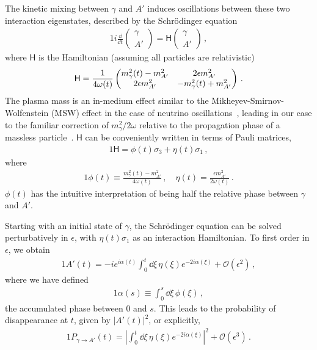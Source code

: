 \documentclass[prd,aps,10pt,nofootinbib,twocolumn,superscriptaddress,preprintnumbers,balancelastpage,longbibliography]{revtex4-1}
\begin{document}
The kinetic mixing between $\gamma$ and $A'$ induces oscillations between these two interaction eigenstates, described by the Schr\"{o}dinger equation
%
\begin{alignat}{1}
    i \frac{\dd}{\dd t} \begin{pmatrix}
        \gamma \\ A'
    \end{pmatrix} = \mathsf{H} \begin{pmatrix}
        \gamma \\ A'
    \end{pmatrix} \,,
\end{alignat}
%
where $\mathsf{H}$ is the Hamiltonian (assuming all particles are relativistic)~\cite{Dasgupta:2005wn}
%
\begin{alignat}{1}
    \mathsf{H} = \frac{1}{4\omega(t)} \begin{pmatrix}
        m_\gamma^2(t) - m_{A^\prime}^2 & 2\epsilon m_{A^\prime}^2 \\
        2 \epsilon m_{A^\prime}^2 & - m_\gamma^2(t) + m_{A^\prime}^2
    \end{pmatrix} \,.
    \label{eq:hamiltonian}
\end{alignat}
%
The plasma mass is an in-medium effect similar to the Mikheyev-Smirnov-Wolfenstein (MSW) effect in the case of neutrino oscillations~\cite{Wolfenstein:1977ue,Mikheev:1986gs}, leading in our case to the familiar correction of $m_\gamma^2/2\omega$ relative to the propagation phase of a massless particle~\cite{Hook:2018iia,Battye:2019aco}.
$\mathsf{H}$ can be conveniently written in terms of Pauli matrices,
%
\begin{alignat}{1}
    \mathsf{H} = \phi(t) \sigma_3 + \eta(t) \sigma_1 \,,
\end{alignat}
%
where
%
\begin{alignat}{1}
    \phi(t) \equiv \frac{m_\gamma^2(t) - m_{A'}^2}{4 \omega(t)}\,, \quad \eta(t) = \frac{\epsilon m_{A'}^2}{2\omega(t)} \,.
\end{alignat}
%
$\phi(t)$ has the intuitive interpretation of being half the relative phase between $\gamma$ and $A'$. 

Starting with an initial state of $\gamma$, the Schr\"{o}dinger equation can be solved perturbatively in $\epsilon$, with $\eta(t)\sigma_1$ as an interaction Hamiltonian. 
To first order in $\epsilon$, we obtain
%
\begin{alignat}{1}
    A'(t) = -i e^{i\alpha(t)} \int_0^t \dd \xi \, \eta(\xi) e^{-2i \alpha(\xi)} + \mathcal{O}(\epsilon^2) \,,
\end{alignat}
% 
where we have defined
%
\begin{alignat}{1}
    \alpha(s) \equiv \int_0^s \dd \xi \, \phi(\xi) \,,
\end{alignat}
%
the accumulated phase between 0 and $s$.
This leads to the probability of disappearance at $t$, given by $|A'(t)|^2$, or explicitly,
%
\begin{alignat}{1}
    P_{\gamma \to A'}(t) = \left| \int_0^t \dd \xi \, \eta(\xi) e^{-2i \alpha(\xi)} \right|^2 + \mathcal{O}(\epsilon^3)\,.
    \label{eq:raw_conv_prob}
\end{alignat}
%
\end{document}
